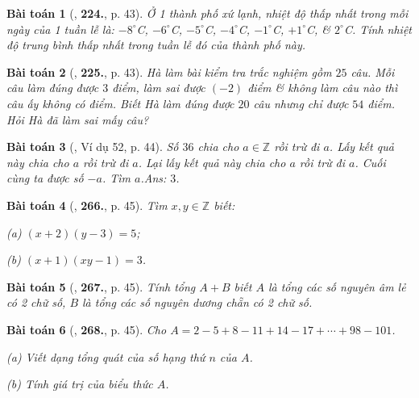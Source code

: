 \documentclass{article}
\numberwithin{equation}{section}
\newtheorem{baitoan}{Bài toán}
\begin{document}
\begin{baitoan}[\cite{Tuyen_Toan_6}, \textbf{224.}, p. 43]
	Ở 1 thành phố xứ lạnh, nhiệt độ thấp nhất trong mỗi ngày của 1 tuần lễ là: $-8^\circ$C, $-6^\circ$C, $-5^\circ$C, $-4^\circ$C, $-1^\circ$C, $+1^\circ$C, \& $2^\circ$C. Tính nhiệt độ trung bình thấp nhất trong tuần lễ đó của thành phố này. 
\end{baitoan}

\begin{baitoan}[\cite{Tuyen_Toan_6}, \textbf{225.}, p. 43]
	Hà làm bài kiểm tra trắc nghiệm gồm $25$ câu. Mỗi câu làm đúng được $3$ điểm, làm sai được $(-2)$ điểm \& không làm câu nào thì câu ấy không có điểm. Biết Hà làm đúng được $20$ câu nhưng chỉ được $54$ điểm. Hỏi Hà đã làm sai mấy câu?
\end{baitoan}

\begin{baitoan}[\cite{Binh_Toan_6_tap_1}, Ví dụ 52, p. 44]
	Số $36$ chia cho $a\in\mathbb{Z}$ rồi trừ đi $a$. Lấy kết quả này chia cho $a$ rồi trừ đi $a$. Lại lấy kết quả này chia cho $a$ rồi trừ đi $a$. Cuối cùng ta được số $-a$. Tìm $a$.\hfill{\sf Ans:} $3$.
\end{baitoan}

\begin{baitoan}[\cite{Binh_Toan_6_tap_1}, \textbf{266.}, p. 45]
	Tìm $x,y\in\mathbb{Z}$ biết:
	\begin{enumerate*}
		\item[(a)] $(x + 2)(y - 3) = 5$;
		\item[(b)] $(x + 1)(xy - 1) = 3$.
	\end{enumerate*}
\end{baitoan}

\begin{baitoan}[\cite{Binh_Toan_6_tap_1}, \textbf{267.}, p. 45]
	Tính tổng $A + B$ biết $A$ là tổng các số nguyên âm lẻ có 2 chữ số, $B$ là tổng các số nguyên dương chẵn có 2 chữ số.
\end{baitoan}

\begin{baitoan}[\cite{Binh_Toan_6_tap_1}, \textbf{268.}, p. 45]
	Cho $A = 2 - 5 + 8 - 11 + 14 - 17 + \cdots + 98 - 101$.
	\begin{enumerate*}
		\item[(a)] Viết dạng tổng quát của số hạng thứ $n$ của $A$.
		\item[(b)] Tính giá trị của biểu thức $A$.
	\end{enumerate*}
\end{baitoan}
\end{document}
